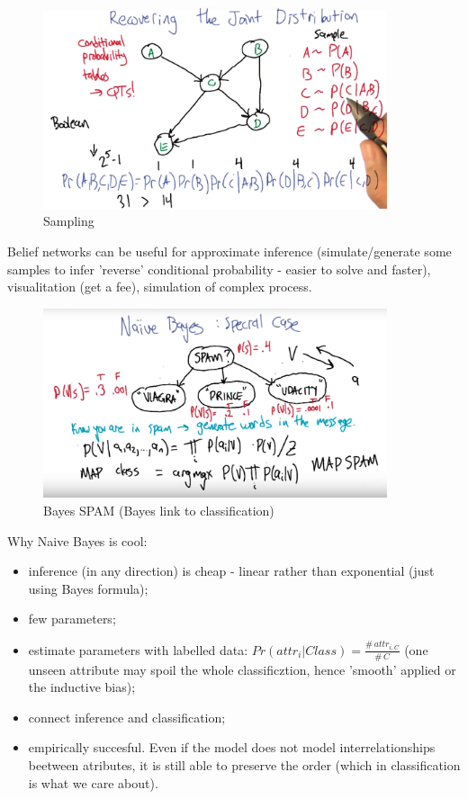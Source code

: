 \documentclass[11pt]{article}
\begin{document}
\begin{figure}[htbp] 
	\centering
	\includegraphics[width=0.9\textwidth]{pics/belief_network1}
	\caption{Sampling} 
	\label{belief_network1}
\end{figure}
Belief networks can be useful for approximate inference (simulate/generate some samples to infer 'reverse' conditional probability - easier to solve and faster), visualitation (get a fee), simulation of complex process. 

\begin{figure}[htbp] 
	\centering
	\includegraphics[width=0.9\textwidth]{pics/Bayesian_special_case}
	\caption{Bayes SPAM (Bayes link to classification)} 
	\label{Bayesian_special_case}
\end{figure}

Why Naive Bayes is cool:
\begin{itemize}
	\item inference (in any direction) is cheap - linear rather than exponential (just using Bayes formula);
	\item few parameters;
	\item estimate parameters with labelled data: $Pr(attr_i | Class) = \frac{\# \, attr_{i,C}}{\# \, C}$ (one unseen attribute may spoil the whole classificztion, hence 'smooth' applied or the inductive bias);
	\item connect inference and classification;
	\item empirically succesful. Even if the model does not model interrelationships beetween atributes, it is still able to preserve the order (which in classification is what we care about).	 
\end{itemize}
\end{document}
